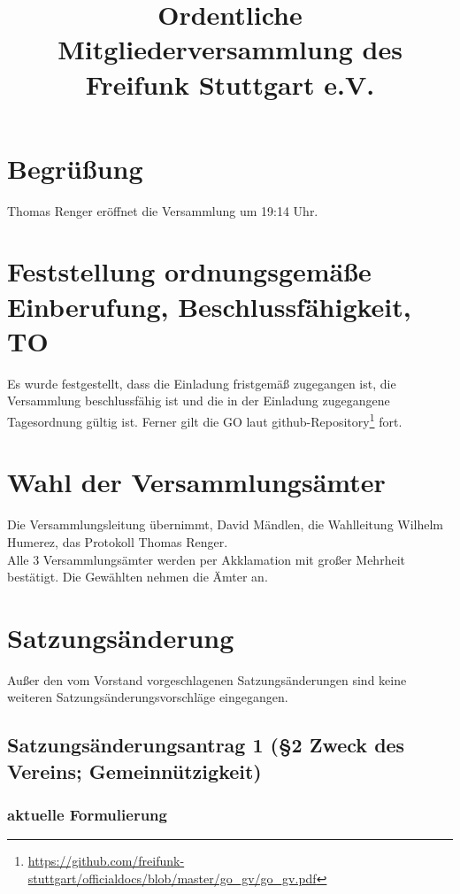 \documentclass[a4paper]{scrartcl}
\title{Ordentliche Mitgliederversammlung des Freifunk Stuttgart e.V.}
\begin{document}
\maketitle

\tableofcontents

\clearpage

\listoftables

\clearpage

\section{Begrüßung}
Thomas Renger eröffnet die Versammlung um 19:14 Uhr.

\section{Feststellung ordnungsgemäße Einberufung, Beschlussfähigkeit, TO}

Es wurde festgestellt, dass die Einladung fristgemäß zugegangen ist, die Versammlung beschlussfähig ist und die in der Einladung zugegangene Tagesordnung gültig ist.
Ferner gilt die GO laut github-Repository\footnote{\url{https://github.com/freifunk-stuttgart/officialdocs/blob/master/go_gv/go_gv.pdf}} fort.

\section{Wahl der Versammlungsämter}

Die Versammlungsleitung übernimmt, David Mändlen, die Wahlleitung Wilhelm Humerez, das Protokoll Thomas Renger.\\
Alle 3 Versammlungsämter werden per Akklamation mit großer Mehrheit bestätigt. Die Gewählten nehmen die Ämter an.

\clearpage
\section{Satzungsänderung}

Außer den vom Vorstand vorgeschlagenen Satzungsänderungen sind keine weiteren Satzungsänderungsvorschläge eingegangen.

\subsection{Satzungsänderungsantrag 1 (§2 Zweck des Vereins; Gemeinnützigkeit)}

\subsubsection{aktuelle Formulierung}
\end{document}
